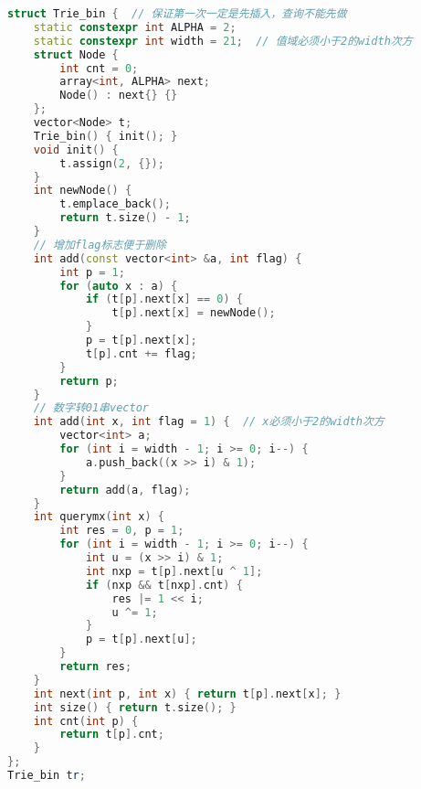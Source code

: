 \begin{lstlisting}[language=C++]
struct Trie_bin {  // 保证第一次一定是先插入，查询不能先做
    static constexpr int ALPHA = 2;
    static constexpr int width = 21;  // 值域必须小于2的width次方
    struct Node {
        int cnt = 0;
        array<int, ALPHA> next;
        Node() : next{} {}
    };
    vector<Node> t;
    Trie_bin() { init(); }
    void init() {
        t.assign(2, {});
    }
    int newNode() {
        t.emplace_back();
        return t.size() - 1;
    }
    // 增加flag标志便于删除
    int add(const vector<int> &a, int flag) {
        int p = 1;
        for (auto x : a) {
            if (t[p].next[x] == 0) {
                t[p].next[x] = newNode();
            }
            p = t[p].next[x];
            t[p].cnt += flag;
        }
        return p;
    }
    // 数字转01串vector
    int add(int x, int flag = 1) {  // x必须小于2的width次方
        vector<int> a;
        for (int i = width - 1; i >= 0; i--) {
            a.push_back((x >> i) & 1);
        }
        return add(a, flag);
    }
    int querymx(int x) {
        int res = 0, p = 1;
        for (int i = width - 1; i >= 0; i--) {
            int u = (x >> i) & 1;
            int nxp = t[p].next[u ^ 1];
            if (nxp && t[nxp].cnt) {
                res |= 1 << i;
                u ^= 1;
            }
            p = t[p].next[u];
        }
        return res;
    }
    int next(int p, int x) { return t[p].next[x]; }
    int size() { return t.size(); }
    int cnt(int p) {
        return t[p].cnt;
    }
};
Trie_bin tr;
\end{lstlisting}

